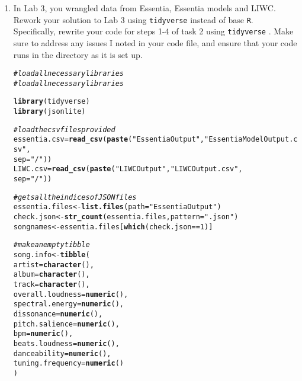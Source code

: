 \documentclass{article}\usepackage[]{graphicx}\usepackage[]{xcolor}
\makeatletter
\newcommand{\hlnum}[1]{\textcolor[rgb]{0.686,0.059,0.569}{#1}}%
\newcommand{\hlsng}[1]{\textcolor[rgb]{0.192,0.494,0.8}{#1}}%
\newcommand{\hlcom}[1]{\textcolor[rgb]{0.678,0.584,0.686}{\textit{#1}}}%
\newcommand{\hlopt}[1]{\textcolor[rgb]{0,0,0}{#1}}%
\newcommand{\hldef}[1]{\textcolor[rgb]{0.345,0.345,0.345}{#1}}%
\newcommand{\hlkwb}[1]{\textcolor[rgb]{0.69,0.353,0.396}{#1}}%
\newcommand{\hlkwc}[1]{\textcolor[rgb]{0.333,0.667,0.333}{#1}}%
\newcommand{\hlkwd}[1]{\textcolor[rgb]{0.737,0.353,0.396}{\textbf{#1}}}%
\newenvironment{kframe}{%
 \def\at@end@of@kframe{}%
 \ifinner\ifhmode%
  \def\at@end@of@kframe{\end{minipage}}%
  \begin{minipage}{\columnwidth}%
 \fi\fi%
 \def\FrameCommand##1{\hskip\@totalleftmargin \hskip-\fboxsep
 \colorbox{shadecolor}{##1}\hskip-\fboxsep
     \hskip-\linewidth \hskip-\@totalleftmargin \hskip\columnwidth}%
 \MakeFramed {\advance\hsize-\width
   \@totalleftmargin\z@ \linewidth\hsize
   \@setminipage}}%
 {\par\unskip\endMakeFramed%
 \at@end@of@kframe}
\newenvironment{knitrout}{}{} %
\makeatother
\begin{document}
\begin{enumerate}
\item In Lab 3, you wrangled data from Essentia, Essentia models and LIWC. Rework your 
solution to Lab 3 using \texttt{tidyverse} \citep{tidyverse} instead of base \texttt{R}.
Specifically, rewrite your code for steps 1-4 of task 2 using \texttt{tidyverse} \citep{tidyverse}. 
Make sure to address any issues I noted in your code file, and ensure that your code 
runs in the directory as it is set up.
\begin{knitrout}\scriptsize
{}\color{fgcolor}\begin{kframe}
\begin{alltt}
\hlcom{#load all necessary libraries}
\hlcom{#load all necessary libraries}

\hlkwd{library}\hldef{(tidyverse)}
\hlkwd{library}\hldef{(jsonlite)}

\hlcom{#load the csv files provided}
\hldef{essentia.csv} \hlkwb{=} \hlkwd{read_csv}\hldef{(}\hlkwd{paste}\hldef{(}\hlsng{"EssentiaOutput"}\hldef{,} \hlsng{"EssentiaModelOutput.csv"}\hldef{,}
                              \hlkwc{sep} \hldef{=} \hlsng{"/"}\hldef{))}
\hldef{LIWC.csv} \hlkwb{=} \hlkwd{read_csv}\hldef{(}\hlkwd{paste}\hldef{(}\hlsng{"LIWCOutput"}\hldef{,} \hlsng{"LIWCOutput.csv"}\hldef{,}
                          \hlkwc{sep} \hldef{=} \hlsng{"/"}\hldef{))}

\hlcom{#gets all the indices of JSON files}
\hldef{essentia.files} \hlkwb{<-} \hlkwd{list.files}\hldef{(}\hlkwc{path} \hldef{=} \hlsng{"EssentiaOutput"}\hldef{)}
\hldef{check.json} \hlkwb{<-} \hlkwd{str_count}\hldef{(essentia.files,} \hlkwc{pattern}\hldef{=}\hlsng{".json"}\hldef{)}
\hldef{songnames} \hlkwb{<-} \hldef{essentia.files[}\hlkwd{which}\hldef{(check.json} \hlopt{==} \hlnum{1}\hldef{)]}

\hlcom{#make an empty tibble}
\hldef{song.info} \hlkwb{<-} \hlkwd{tibble}\hldef{(}
  \hlkwc{artist} \hldef{=} \hlkwd{character}\hldef{(),}
  \hlkwc{album} \hldef{=} \hlkwd{character}\hldef{(),}
  \hlkwc{track} \hldef{=} \hlkwd{character}\hldef{(),}
  \hlkwc{overall.loudness} \hldef{=} \hlkwd{numeric}\hldef{(),}
  \hlkwc{spectral.energy} \hldef{=} \hlkwd{numeric}\hldef{(),}
  \hlkwc{dissonance} \hldef{=} \hlkwd{numeric}\hldef{(),}
  \hlkwc{pitch.salience} \hldef{=} \hlkwd{numeric}\hldef{(),}
  \hlkwc{bpm} \hldef{=} \hlkwd{numeric}\hldef{(),}
  \hlkwc{beats.loudness} \hldef{=} \hlkwd{numeric}\hldef{(),}
  \hlkwc{danceability} \hldef{=} \hlkwd{numeric}\hldef{(),}
  \hlkwc{tuning.frequency} \hldef{=} \hlkwd{numeric}\hldef{()}
\hldef{)}


\end{alltt}
\end{kframe}
\end{knitrout}
\end{enumerate}
\end{document}
